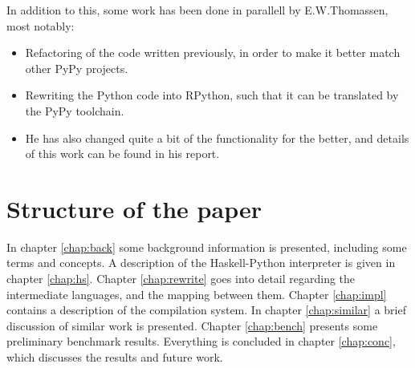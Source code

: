 In addition to this, some work has been done in parallell by E.W.Thomassen,
most notably:
\begin{itemize}

\item Refactoring of the code written previously, in order to make it better 
match other PyPy projects.

\item Rewriting the Python code into RPython, such that it can be translated by
the PyPy toolchain.

\item He has also changed quite a bit of the functionality for the better,
and details of this work can be found in his report.

\end{itemize}



\section{Structure of the paper}
In chapter \ref{chap:back} some background information is presented, including 
some terms and concepts. 
%
A description of the 
Haskell-Python interpreter is given in chapter \ref{chap:hs}.
%
Chapter \ref{chap:rewrite} goes into detail regarding the intermediate 
languages, and the mapping between them.
%
%
%
%
Chapter \ref{chap:impl} contains a description of the compilation system.
%
In chapter \ref{chap:similar} a brief discussion of similar work is presented.
%
Chapter \ref{chap:bench} presents some preliminary benchmark results.
%
Everything is concluded in chapter \ref{chap:conc}, which discusses 
the results and future work.
